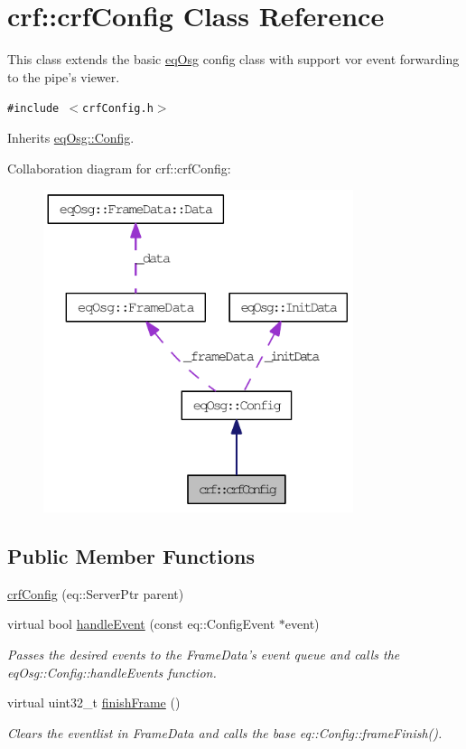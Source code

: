 \hypertarget{a00004}{
\section{crf::crfConfig Class Reference}
\label{a00004}
}
This class extends the basic \hyperlink{a00045}{eqOsg} config class with support vor event forwarding to the pipe's viewer.  


{\tt \#include $<$crfConfig.h$>$}

Inherits \hyperlink{a00003}{eqOsg::Config}.

Collaboration diagram for crf::crfConfig:\nopagebreak
\begin{figure}[H]
\begin{center}
\leavevmode
\includegraphics[width=257pt]{a00070}
\end{center}
\end{figure}
\subsection*{Public Member Functions}
\begin{CompactItemize}
\item 
\hyperlink{a00004_3ddcfcc9f305f6e8502078f922d7280f}{crfConfig} (eq::ServerPtr parent)
\item 
virtual bool \hyperlink{a00004_63938a0cf75d236b677c4cb147933b3c}{handleEvent} (const eq::ConfigEvent $\ast$event)
\begin{CompactList}\small\item\em Passes the desired events to the FrameData's event queue and calls the eqOsg::Config::handleEvents function. \item\end{CompactList}\item 
virtual uint32\_\-t \hyperlink{a00004_ebe9cfdff7f345f6d1f706be246520f7}{finishFrame} ()
\begin{CompactList}\small\item\em Clears the eventlist in FrameData and calls the base eq::Config::frameFinish(). \item\end{CompactList}\end{CompactItemize}



